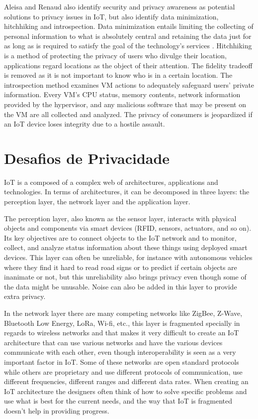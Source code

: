 \documentclass[conference]{IEEEtran}
\begin{document}
Aleisa and Renaud \cite{aleisa2016privacy} also identify security and privacy
awareness as potential solutions to privacy issues in IoT, but also identify
data minimization, hitchhiking and introspection. Data minimization entails
limiting the collecting of personal information to what is absolutely central
and retaining the data just for as long as is required to satisfy the goal
of the technology's services \cite{ojDirective281}. Hitchhiking \cite{tang2006putting}
is a method of protecting the privacy of users who divulge their location,
applications regard locations as the object of their attention. The fidelity
tradeoff is removed as it is not important to know who is in a certain
location. The introspection \cite{kang2015protection} method examines VM
actions to adequately safeguard users' private information. Every VM's
CPU status, memory contents, network information provided by the hypervisor,
and any malicious software that may be present on the VM are all collected
and analyzed. The privacy of consumers is jeopardized if an IoT device
loses integrity due to a hostile assault.

\section{Desafios de Privacidade}

IoT is a composed of a complex web of architectures, applications and technologies.
In terms of architectures, it can be decomposed in three layers: the perception
layer, the network layer and the application layer.

The perception layer, also known as the sensor layer, interacts with physical
objects and components via smart devices (RFID, sensors, actuators, and
so on). Its key objectives are to connect objects to the IoT network and
to monitor, collect, and analyze status information about these things using
deployed smart devices. This layer can often be unreliable, for instance
with autonomous vehicles where they find it hard to read road signs or to
predict if certain objects are inanimate or not, but this unreliability
also brings privacy even though some of the data might be unusable. Noise
can also be added in this layer to provide extra privacy.

In the network layer there are many competing networks like ZigBee, Z-Wave,
Bluetooth Low Energy, LoRa, Wi-fi, etc., this layer is fragmented specially
in regards to wireless networks and that makes it very difficult to create
an IoT architecture that can use various networks and have the various
devices communicate with each other, even though interoperability is seen
as a very important factor in IoT. Some of these networks are open standard
protocols while others are proprietary and use different protocols of communication,
use different frequencies, different ranges and different data rates. When
creating an IoT architecture the designers often think of how to solve
specific problems and use what is best for the current needs, and the way
that IoT is fragmented doesn't help in providing progress.
\end{document}
